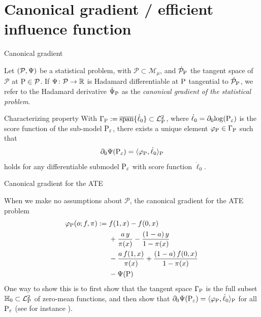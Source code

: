 \documentclass{beamer}\usepackage{listings}
\begin{document}
\section{Canonical gradient / efficient influence function}
\label{sec:orgb938bb6}
\begin{frame}[label={sec:orgab2aab0}]{Canonical gradient}
\begin{definition}
Let \((\mathcal{P}, \TT)\) be a statistical problem, with \(\mathcal{P} \subset \mathcal{M}_{\mu}\),
and \(\dot{\mathcal{P}}_{\P}\) the tangent space of \(\mathcal{P}\) at \(\P \in \mathcal{P}\). If
\(\TT \colon \mathcal{P} \rightarrow \R\) is Hadamard differentiable at \(\P\) tangential to
\(\dot{\mathcal{P}}_{\P}\), we refer to the Hadamard derivative \(\dot{\TT}_{\P}\) as the
\textit{canonical gradient of the statistical problem}.

\pause
\end{definition}

\begin{block}{Characterizing property}
With $\Gamma_{\P} := \overline{\mathrm{span}}\{\dot{\ell}_0\} \subset \lp$, where
$\dot{\ell}_0 = \partial_0{\log(\P_{\epsilon})}$ is the score function of the sub-model
$\P_{\epsilon}$, there exists a unique element $\phi_{\P} \in \Gamma_{\P}$ such that
\begin{equation*}
  \partial_0{\TT(\P_{\epsilon})}
  = \langle \phi_{\P}, \dot{\ell}_0 \rangle_{\P}
\end{equation*}
holds for any differentiable submodel $\P_{\epsilon}$ with score function $\dot{\ell}_0$.
\end{block}
\end{frame}

\begin{frame}[label={sec:org40a9f87}]{Canonical gradient for the ATE}
\begin{example}[ATE]
When we make no assumptions about \(\mathcal{P}\), the canonical gradient for the ATE problem
\begin{align*}
  \phi_{\P}(o; f, \pi) := \;& f(1,x) - f(0,x) \\
                             & +  \frac{a\,y}{\pi(x)} - \frac{(1-a)\,y}{1-\pi(x)} \\
                             &  - \frac{a\,f(1,x)}{\pi(x)} +
                               \frac{(1-a)\,f(0,x)}{1-\pi(x)} \\
                             &  - \TT(\P)
\end{align*}
\pause One way to show this is to first show that the tangent space $\Gamma_{\P}$ is the full subset
$\mathbb{H}_0 \subset \lp$ of zero-mean functions, and then show that
$ \partial_0{\TT(\P_{\epsilon})} = \langle \phi_{\P}, \dot{\ell}_0 \rangle_{\P}$ for all
$\P_{\epsilon}$ (see for instance \cite{kennedy2016semiparametric}).
\end{example}
\end{frame}
\end{document}
